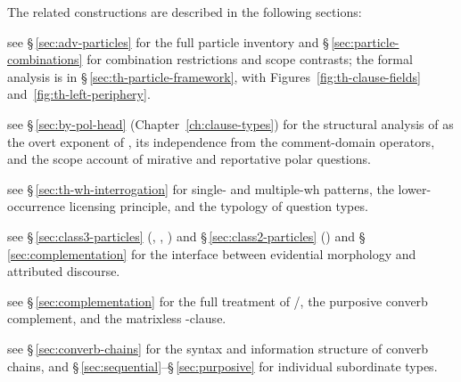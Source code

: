 The related constructions are described in the following sections:

\begin{description}[leftmargin=2em, labelwidth=!, labelindent=0em]
\item[\upshape Left-periphery structure (§\,\ref{sec:th-left-periphery}):] see
	§\,\ref{sec:adv-particles} for the full particle inventory and
	§\,\ref{sec:particle-combinations} for combination restrictions and
	scope contrasts; the formal analysis is in
	§\,\ref{sec:th-particle-framework}, with Figures~\ref{fig:th-clause-fields}
	and~\ref{fig:th-left-periphery}.
\item[\upshape Polar questions (§\,\ref{sec:th-polar-questions}):] see
	§\,\ref{sec:by-pol-head} (Chapter~\ref{ch:clause-types}) for the
	structural analysis of  as the overt exponent of
	, its independence from the
	comment-domain operators, and the scope account of mirative and
	reportative polar questions.
\item[\upshape \textit{Wh}-interrogation (§\,\ref{sec:th-wh-interrogation}):] see
	§\,\ref{sec:th-wh-interrogation} for single- and multiple-wh patterns, the
	lower-occurrence licensing principle, and the typology of question types.
\item[\upshape Evidential particles (§\,\ref{sec:class3-particles}):] see
	§\,\ref{sec:class3-particles} (, , )
	and §\,\ref{sec:class2-particles} () and §\,\ref{sec:complementation} for the interface between
	evidential morphology and attributed discourse.
\item[\upshape Complementation (§\,\ref{sec:complementation}):] see
	§\,\ref{sec:complementation} for the full treatment of /,
	the purposive converb complement, and the matrixless -clause.
\item[\upshape Head-finality and subordination (§\,\ref{sec:th-subord-headfinal}):] see
	§\,\ref{sec:converb-chains} for the syntax and information structure of
	converb chains, and §\,\ref{sec:sequential}--§\,\ref{sec:purposive} for
	individual subordinate types.
\end{description}
